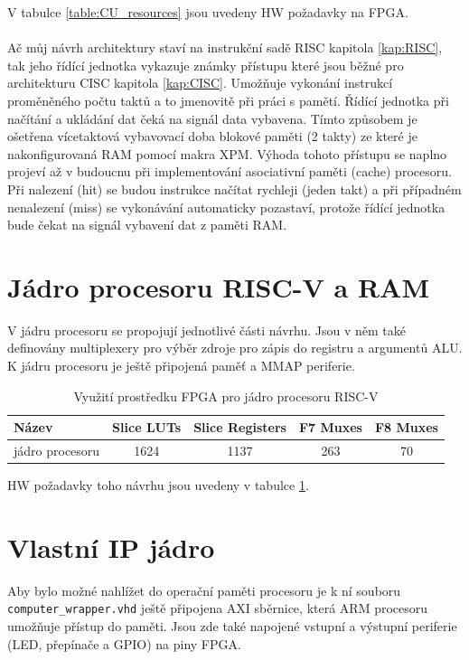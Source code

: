 \documentclass[FM,BP]{tulthesis}
\begin{document}
V tabulce \ref{table:CU_resources} jsou uvedeny HW požadavky na FPGA.

\paragraph{}
Ač můj návrh architektury staví na instrukční sadě RISC 
kapitola \ref{kap:RISC}, tak jeho řídící jednotka vykazuje známky přístupu které jsou běžné pro architekturu CISC kapitola \ref{kap:CISC}. Umožňuje vykonání instrukcí proměněného počtu taktů a to jmenovitě při práci s pamětí. Řídící jednotka při načítání a ukládání dat čeká na signál data vybavena. Tímto způsobem je ošetřena vícetaktová vybavovací doba blokové paměti (2 takty) ze které je nakonfigurovaná RAM pomocí makra XPM.  
Výhoda tohoto přístupu se naplno projeví až v budoucnu při implementování asociativní paměti (cache) procesoru. Při nalezení (hit) se budou instrukce načítat rychleji (jeden takt) a při případném nenalezení (miss) se vykonávání automaticky pozastaví, protože řídící jednotka bude čekat na signál vybavení dat z paměti RAM.

\newpage
\section{Jádro procesoru RISC-V a RAM}
V jádru procesoru se propojují jednotlivé části návrhu. Jsou v něm také definovány multiplexery pro výběr zdroje pro zápis do registru a argumentů ALU. K jádru procesoru je ještě připojená paměť a MMAP periferie. 

\begin{table}[h]
    \caption{Využití prostředku FPGA pro jádro procesoru RISC-V}
    \label{table:RISC-V_core_resources}
    \begin{center}
        \begin{tabular}{|l|c|c|c|c|}
        \hline
        \textbf{Název} & 
        \textbf{Slice LUTs} & 
        \textbf{Slice Registers} & 
        \textbf{F7 Muxes} & 
        \textbf{F8 Muxes} \\
        \hline
        jádro procesoru & 1624 & 1137 & 263 & 70 \\
        \hline
        \end{tabular}
    \end{center}
\end{table}

HW požadavky toho návrhu jsou uvedeny v tabulce \ref{table:RISC-V_core_resources}.


\section{Vlastní IP jádro}
Aby bylo možné nahlížet do operační paměti procesoru je k ní souboru \verb|computer_wrapper.vhd| ještě připojena AXI sběrnice, která ARM procesoru umožňuje přístup do paměti. Jsou zde také napojené vstupní a výstupní periferie (LED, přepínače a GPIO) na piny FPGA.
\end{document}
